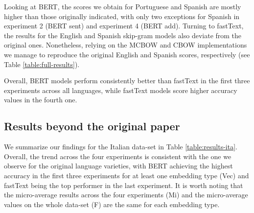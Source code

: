 Looking at BERT, the scores we obtain for Portuguese and Spanish are mostly higher than those originally indicated, with only two exceptions for Spanish in experiment 2 (BERT sent) and experiment 4 (BERT add). Turning to fastText, the results for the English and Spanish skip-gram models also deviate from the original ones. Nonetheless, relying on the MCBOW \citep{fasttext:mcbow:2018} and CBOW \citep{fasttext:2018} implementations we manage to reproduce the original English and Spanish scores, respectively (see Table \ref{table:full-results}).

Overall, BERT models perform consistently better than fastText in the first three experiments across all languages, while fastText models score higher accuracy values in the fourth one.



\subsection{Results beyond the original paper}
We summarize our findings for the Italian data-set in Table \ref{table:results-ita}. Overall, the trend across the four experiments is consistent with the one we observe for the original language varieties, with BERT achieving the highest accuracy in the first three experiments for at least one embedding type (Vec) and fastText being the top performer in the last experiment. It is worth noting that the micro-average results across the four experiments (Mi) and the micro-average values on the whole data-set (F) are the same for each embedding type.

